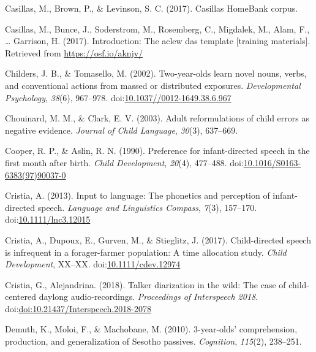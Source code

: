 \documentclass[floatsintext,man]{apa6}
\theoremstyle{definition}
\theoremstyle{definition}
\theoremstyle{definition}
\theoremstyle{remark}
\begin{document}
\hypertarget{ref-Casillas-HB}{}
Casillas, M., Brown, P., \& Levinson, S. C. (2017). Casillas HomeBank
corpus.

\hypertarget{ref-casillas2017ACLEWDAS}{}
Casillas, M., Bunce, J., Soderstrom, M., Rosemberg, C., Migdalek, M.,
Alam, F., \ldots{} Garrison, H. (2017). Introduction: The aclew das
template {[}training materials{]}. Retrieved from
\url{https://osf.io/aknjv/}

\hypertarget{ref-childers2002two}{}
Childers, J. B., \& Tomasello, M. (2002). Two-year-olds learn novel
nouns, verbs, and conventional actions from massed or distributed
exposures. \emph{Developmental Psychology}, \emph{38}(6), 967--978.
doi:\href{https://doi.org/10.1037//0012-1649.38.6.967}{10.1037//0012-1649.38.6.967}

\hypertarget{ref-chouinard2003adult}{}
Chouinard, M. M., \& Clark, E. V. (2003). Adult reformulations of child
errors as negative evidence. \emph{Journal of Child Language},
\emph{30}(3), 637--669.

\hypertarget{ref-cooper1990preference}{}
Cooper, R. P., \& Aslin, R. N. (1990). Preference for infant-directed
speech in the first month after birth. \emph{Child Development},
\emph{20}(4), 477--488.
doi:\href{https://doi.org/10.1016/S0163-6383(97)90037-0}{10.1016/S0163-6383(97)90037-0}

\hypertarget{ref-cristia2013input}{}
Cristia, A. (2013). Input to language: The phonetics and perception of
infant-directed speech. \emph{Language and Linguistics Compass},
\emph{7}(3), 157--170.
doi:\href{https://doi.org/10.1111/lnc3.12015}{10.1111/lnc3.12015}

\hypertarget{ref-cristia2017child}{}
Cristia, A., Dupoux, E., Gurven, M., \& Stieglitz, J. (2017).
Child-directed speech is infrequent in a forager-farmer population: A
time allocation study. \emph{Child Development}, XX--XX.
doi:\href{https://doi.org/10.1111/cdev.12974}{10.1111/cdev.12974}

\hypertarget{ref-cristia2018talker}{}
Cristia, G., Alejandrina. (2018). Talker diarization in the wild: The
case of child-centered daylong audio-recordings. \emph{Proceedings of
Interspeech 2018}.
doi:\href{https://doi.org/doi:10.21437/Interspeech.2018-2078}{doi:10.21437/Interspeech.2018-2078}

\hypertarget{ref-demuth2010three}{}
Demuth, K., Moloi, F., \& Machobane, M. (2010). 3-year-olds'
comprehension, production, and generalization of Sesotho passives.
\emph{Cognition}, \emph{115}(2), 238--251.
\end{document}
